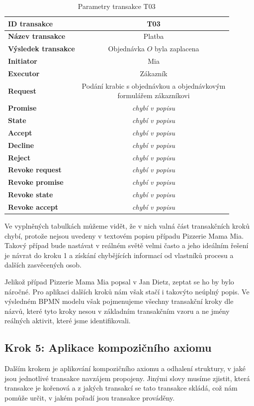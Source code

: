 \begin{table} [H] \centering
\begin{tabular}{|>{\bfseries} l| | c |}
\hline
  ID transakce & T03 \\
\hline
  Název transakce & Platba  \\
\hline
  Výsledek transakce & Objednávka $O$ byla zaplacena \\
\hline
  Initiator & Mia \\
\hline
  Executor & Zákazník \\
\hline
\hline
  Request & \makecell{Podání krabic s objednávkou a objednávkovým\\ formulářem zákazníkovi} \\
\hline
  Promise &  \textit{chybí v popisu} \\
\hline
  State & \textit{chybí v popisu} \\
\hline
  Accept & \textit{chybí v popisu} \\
\hline
\hline
  Decline &  \textit{chybí v popisu} \\
\hline
  Reject & \textit{chybí v popisu} \\
\hline
\hline
  Revoke request & \textit{chybí v popisu} \\
\hline
  Revoke promise & \textit{chybí v popisu} \\
\hline
  Revoke state & \textit{chybí v popisu} \\
\hline
  Revoke accept & \textit{chybí v popisu} \\
\hline
\end{tabular}
\caption{Parametry transakce T03}
\label{tab:t03_param}
\end{table}

Ve vyplněných tabulkách můžeme vidět, že v nich valná část transakčních kroků chybí, protože nejsou uvedeny v textovém popisu případu Pizzerie Mama Mia. Takový případ bude nastávat v reálném světě velmi často a jeho ideálním řešení je návrat do kroku 1 a získání chybějících informací od vlastníků procesu a dalších zasvěcených osob.

Jelikož případ Pizzerie Mama Mia popsal v \cite{Dietz2006} Jan Dietz, zeptat se ho by bylo náročné. Pro aplikaci dalších kroků nám však stačí i takovýto neúplný popis. Ve výsledném BPMN modelu však pojmenujeme všechny transakční kroky dle názvů, které tyto kroky nesou v základním transakčním vzoru a ne jmény reálných aktivit, které jsme identifikovali.

\subsection{Krok 5: Aplikace kompozičního axiomu}
Dalším krokem je aplikování kompozičního axiomu a odhalení struktury, v jaké jsou jednotlivé transakce navzájem propojeny. Jinými slovy musíme zjistit, která transakce je kořenová a z jakých transakcí se tato transakce skládá, což nám pomůže určit, v jakém pořadí jsou transakce prováděny.

